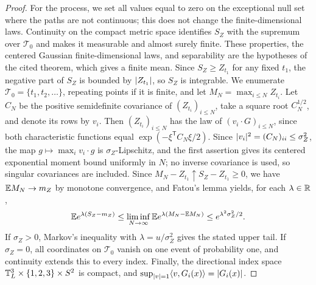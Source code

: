 \begin{proof}
For the process, we set all values equal to zero on the exceptional null set where the paths are not continuous; this does not change the finite-dimensional laws. Continuity on the compact metric space identifies $S_Z$ with the supremum over $\mathcal T_0$ and makes it measurable and almost surely finite. These properties, the centered Gaussian finite-dimensional laws, and separability are the hypotheses of the cited theorem, which gives a finite mean. Since $S_Z\ge Z_{t_1}$ for any fixed $t_1$, the negative part of $S_Z$ is bounded by $\lvert Z_{t_1}\rvert$, so $S_Z$ is integrable. We enumerate $\mathcal T_0=\{t_1,t_2,\dots\}$, repeating points if it is finite, and let $M_N=\max_{i\le N}Z_{t_i}$. Let $C_N$ be the positive semidefinite covariance of $(Z_{t_i})_{i\le N}$, take a square root $C_N^{1/2}$, and denote its rows by $v_i$. Then $(Z_{t_i})_{i\le N}$ has the law of $(v_i\cdot G)_{i\le N}$, since both characteristic functions equal $\exp(-\xi^{\mathsf T}C_N\xi/2)$. Since $\lvert v_i\rvert^2=(C_N)_{ii}\le\sigma_Z^2$, the map $g\mapsto\max_iv_i\cdot g$ is $\sigma_Z$-Lipschitz, and the first assertion gives its centered exponential moment bound uniformly in $N$; no inverse covariance is used, so singular covariances are included. Since $M_N-Z_{t_1}\uparrow S_Z-Z_{t_1}\ge0$, we have $\mathbb E M_N\to m_Z$ by monotone convergence, and Fatou's lemma yields, for each $\lambda\in\mathbb R$,
\[
 \mathbb E e^{\lambda(S_Z-m_Z)}\le\liminf_{N\to\infty}\mathbb E e^{\lambda(M_N-\mathbb E M_N)}\le e^{\lambda^2\sigma_Z^2/2}.
\]
If $\sigma_Z>0$, Markov's inequality with $\lambda=u/\sigma_Z^2$ gives the stated upper tail. If $\sigma_Z=0$, all coordinates on $\mathcal T_0$ vanish on one event of probability one, and continuity extends this to every index. Finally, the directional index space $\mathbb T_L^3\times\{1,2,3\}\times S^2$ is compact, and $\sup_{\lvert v\rvert=1}\langle v,G_i(x)\rangle=\lvert G_i(x)\rvert$.
\end{proof}

